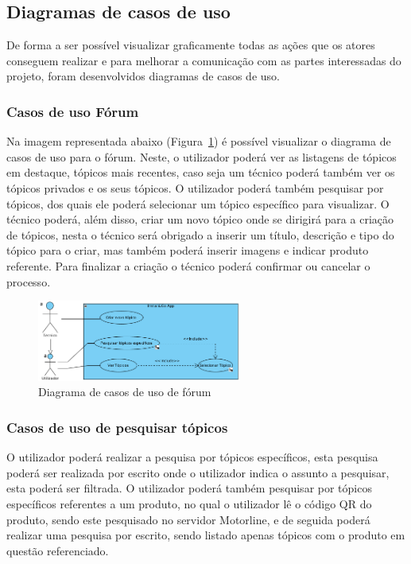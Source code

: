 
\subsection{Diagramas de casos de uso}
De forma a ser possível visualizar graficamente todas as ações que os 
atores conseguem realizar e para melhorar a comunicação com as 
partes interessadas do projeto, foram desenvolvidos diagramas de 
casos de uso.

\subsubsection{Casos de uso Fórum}
Na imagem representada abaixo (Figura~\ref{fig:9}) é possível 
visualizar o diagrama de casos de uso para o fórum.
Neste, o utilizador poderá ver as listagens de tópicos em destaque, tópicos mais recentes, caso seja um 
técnico poderá também ver os tópicos privados e os seus tópicos. 
O utilizador poderá também pesquisar por tópicos,  dos quais ele poderá selecionar um tópico 
específico para visualizar. 
O técnico poderá, além disso, criar um novo tópico onde se dirigirá para a criação de tópicos,
nesta o técnico será obrigado a inserir um título, descrição e tipo do tópico para o criar, 
mas também poderá inserir imagens e indicar produto referente.
Para finalizar a criação o técnico poderá confirmar ou cancelar o processo. 

\begin{figure}[htb]
    \centering
    \includegraphics[width=0.6\textwidth]{images/diagramas/casos_de_uso/use_case_forum.png}
    \caption{Diagrama de casos de uso de fórum}
    \label{fig:9}
\end{figure}

\subsubsection{Casos de uso de pesquisar tópicos}

O utilizador poderá realizar a pesquisa por tópicos específicos, 
esta pesquisa poderá ser realizada por escrito onde o utilizador indica o assunto a pesquisar, esta poderá ser filtrada.
O utilizador poderá também pesquisar por tópicos específicos referentes a um produto, no qual o utilizador 
lê o código QR do produto, sendo este pesquisado no servidor Motorline, e de seguida poderá realizar 
uma pesquisa por escrito, sendo listado apenas tópicos com o produto em questão referenciado.

